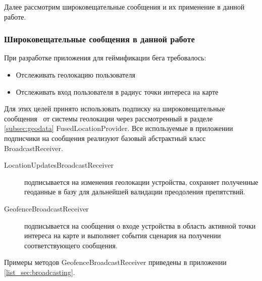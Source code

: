 Далее рассмотрим широковещательные сообщения и их применение в данной работе.

\subsubsection*{Широковещательные сообщения в данной работе}
При разработке приложения для геймификации бега требовалось:
\begin{itemize}
	\item Отслеживать геолокацию пользователя
	\item Отслеживать вход пользователя в радиус точки интереса на карте
\end{itemize}
\smallskip
Для этих целей принято использовать подписку на широковещательные сообщения~\autocite{android_broasdcast} от системы геолокации через рассмотренный в разделе \ref{subsec:geodata} FusedLocationProvider.
Все используемые в приложении подписчики на сообщения реализуют базовый абстрактный класс BroadcastReceiver.
\begin{description}
	\item[LocationUpdatesBroadcastReceiver] подписывается на изменения геолокации устройства, сохраняет полученные геоданные в базу для дальнейшей валидации преодоления препятствий.
	\item[GeofenceBroadcastReceiver] подписывается на сообщения о входе устройства в область активной точки интереса на карте и выполняет события сценария на получении соответствующего сообщения.
\end{description}
\smallskip
Примеры методов GeofenceBroadcastReceiver приведены в приложении \ref{list_sec:broadcasting}.